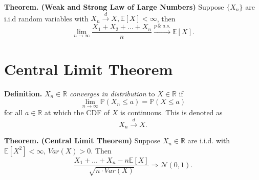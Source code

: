 \documentclass{article}
\begin{document}
\textbf{Theorem. (Weak and Strong Law of Large Numbers)} Suppose $\{X_n\}$ are i.i.d random variables with $X_n \xrightarrow{d} X, \mathbb{E}[X] < \infty$, then
$$\lim_{n \to \infty}\frac{X_1 + X_2 + \dots +X_n}{n} \xrightarrow{p \ \& \ a.s.} \mathbb{E}[X].$$

\section{Central Limit Theorem}

\textbf{Definition.} $X_n\in \mathbb{R}$ \emph{converges in distribution} to $X \in \mathbb{R}$ if
                     $$\lim_{n \to \infty}\mathbb{P}(X_n \leq a) = \mathbb{P}(X \leq a)$$
                     for all $a \in \mathbb{R}$ at which the CDF of $X$ is continuous. This is denoted as $$X_n \xrightarrow{d} X.$$

                     \textbf{Theorem. (Central Limit Theorem)} Suppose $X_n \in \mathbb{R}$ are i.i.d. with $\mathbb{E}[X^2] < \infty$, $Var(X) > 0$. Then
                     $$\frac{X_1+\dots+X_n - n\mathbb{E}[X]}{\sqrt{n\cdot Var(X)}} \Rightarrow \mathcal{N}(0,1).$$
\end{document}
